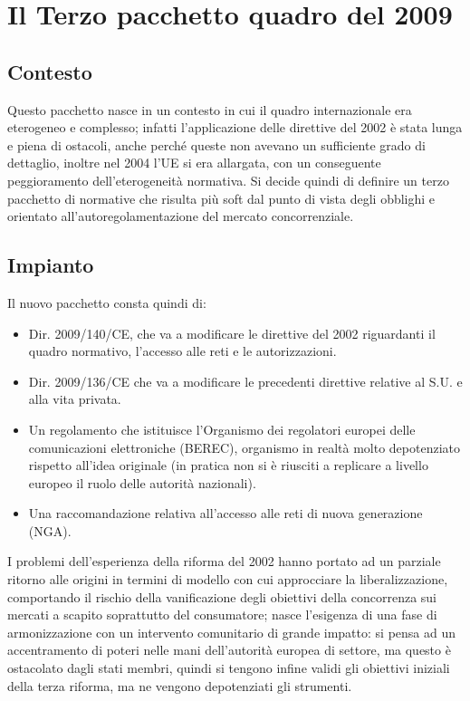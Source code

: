 \section{Il Terzo pacchetto quadro del 2009}

\subsection{Contesto}
Questo pacchetto nasce in un contesto in cui il quadro internazionale era eterogeneo e complesso; infatti l’applicazione delle direttive del 2002 è stata lunga e piena di ostacoli, anche perché queste non avevano un sufficiente grado di dettaglio, inoltre nel 2004 l’UE si era allargata, con un conseguente peggioramento dell’eterogeneità normativa. Si decide quindi di definire un terzo pacchetto di normative che risulta più soft dal punto di vista degli obblighi e orientato all’autoregolamentazione del mercato concorrenziale.

\subsection{Impianto}
Il nuovo pacchetto consta quindi di:
\begin{itemize}
    \item Dir. 2009/140/CE, che va a modificare le direttive del 2002 riguardanti il quadro normativo, l’accesso    alle reti e le autorizzazioni.
    \item Dir. 2009/136/CE che va a modificare le precedenti direttive relative al S.U. e alla vita privata.
    \item Un regolamento che istituisce l'Organismo dei regolatori europei delle comunicazioni elettroniche (BEREC), organismo in realtà molto depotenziato rispetto all’idea originale (in pratica non si è riusciti a    replicare a livello europeo il ruolo delle autorità nazionali).
    \item Una raccomandazione relativa all’accesso alle reti di nuova generazione (NGA).
\end{itemize}
 
I problemi dell’esperienza della riforma del 2002 hanno portato ad un parziale ritorno alle origini in termini di modello con cui approcciare la liberalizzazione, comportando il rischio della vanificazione degli obiettivi della concorrenza sui mercati a scapito soprattutto del consumatore; nasce l’esigenza di una fase di armonizzazione con un intervento comunitario di grande impatto: si pensa ad un accentramento di poteri nelle mani dell’autorità europea di settore, ma questo è ostacolato dagli stati membri, quindi si tengono infine validi gli obiettivi iniziali della terza riforma, ma ne vengono depotenziati gli strumenti.


